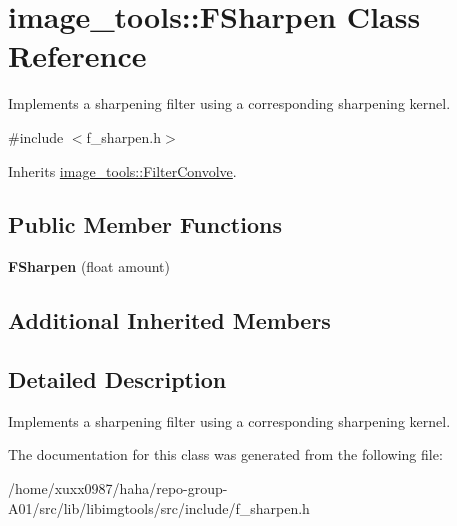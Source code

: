 \hypertarget{classimage__tools_1_1FSharpen}{}\section{image\+\_\+tools\+:\+:F\+Sharpen Class Reference}
\label{classimage__tools_1_1FSharpen}


Implements a sharpening filter using a corresponding sharpening kernel.  




{\ttfamily \#include $<$f\+\_\+sharpen.\+h$>$}



Inherits \hyperlink{classimage__tools_1_1FilterConvolve}{image\+\_\+tools\+::\+Filter\+Convolve}.

\subsection*{Public Member Functions}
\begin{DoxyCompactItemize}
\item 
{\bfseries F\+Sharpen} (float amount)\hypertarget{classimage__tools_1_1FSharpen_a0747ea46d9e9824241e4446d53a93299}{}\label{classimage__tools_1_1FSharpen_a0747ea46d9e9824241e4446d53a93299}

\end{DoxyCompactItemize}
\subsection*{Additional Inherited Members}


\subsection{Detailed Description}
Implements a sharpening filter using a corresponding sharpening kernel. 

The documentation for this class was generated from the following file\+:\begin{DoxyCompactItemize}
\item 
/home/xuxx0987/haha/repo-\/group-\/\+A01/src/lib/libimgtools/src/include/f\+\_\+sharpen.\+h\end{DoxyCompactItemize}
